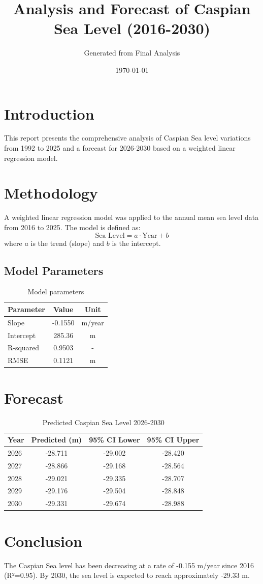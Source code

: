 \documentclass[12pt,a4paper]{article}
\begin{document}
\title{Analysis and Forecast of Caspian Sea Level (2016-2030)}
\author{Generated from Final Analysis}
\date{\today}
\maketitle
\section{Introduction}
This report presents the comprehensive analysis of Caspian Sea level variations
from 1992 to 2025 and a forecast for 2026-2030 based on a weighted linear regression model.
\section{Methodology}
A weighted linear regression model was applied to the annual mean sea level data
from 2016 to 2025. The model is defined as:
\begin{equation}
\text{Sea Level} = a \cdot \text{Year} + b
\end{equation}
where $a$ is the trend (slope) and $b$ is the intercept.
\subsection{Model Parameters}
\begin{table}[h]
\centering
\caption{Model parameters}
\begin{tabular}{lcc}
\hline
Parameter & Value & Unit \\
\hline
Slope & -0.1550 & m/year \\
Intercept & 285.36 & m \\
R-squared & 0.9503 & - \\
RMSE & 0.1121 & m \\
\hline
\end{tabular}
\end{table}
\section{Forecast}
\begin{table}[h]
\centering
\caption{Predicted Caspian Sea Level 2026-2030}
\begin{tabular}{lccc}
\hline
Year & Predicted (m) & 95\% CI Lower & 95\% CI Upper \\
\hline
2026 & -28.711 & -29.002 & -28.420 \\
2027 & -28.866 & -29.168 & -28.564 \\
2028 & -29.021 & -29.335 & -28.707 \\
2029 & -29.176 & -29.504 & -28.848 \\
2030 & -29.331 & -29.674 & -28.988 \\
\hline
\end{tabular}
\end{table}
\section{Conclusion}
The Caspian Sea level has been decreasing at a rate of
-0.155 m/year since 2016 (R²=0.95).
By 2030, the sea level is expected to reach approximately -29.33 m.
\end{document}
